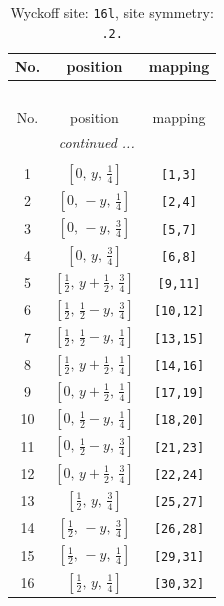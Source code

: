 \documentclass[fleqn,8pt]{jsarticle}
\begin{document}
\renewcommand{\arraystretch}{1.2}
\begin{longtable}{ccc}
\caption{Wyckoff site: {\tt 16l}, site symmetry: {\tt .2.}}
 \\
 \hline \hline
No. & position & mapping \\ \hline \endfirsthead

\multicolumn{2}{l}{\tablename\ \thetable{}} \\
 \hline \hline
No. & position & mapping \\ \hline \endhead

 \hline \hline
\multicolumn{2}{r}{\footnotesize\it continued ...} \\ \endfoot

 \hline \hline
\multicolumn{2}{r}{} \\ \endlastfoot

1 & $\left[ 0,\, y,\, \frac{1}{4} \right]$ & {\tt [1,3]} \\ \hline
2 & $\left[ 0,\, - y,\, \frac{1}{4} \right]$ & {\tt [2,4]} \\ \hline
3 & $\left[ 0,\, - y,\, \frac{3}{4} \right]$ & {\tt [5,7]} \\ \hline
4 & $\left[ 0,\, y,\, \frac{3}{4} \right]$ & {\tt [6,8]} \\ \hline
5 & $\left[ \frac{1}{2},\, y + \frac{1}{2},\, \frac{3}{4} \right]$ & {\tt [9,11]} \\ \hline
6 & $\left[ \frac{1}{2},\, \frac{1}{2} - y,\, \frac{3}{4} \right]$ & {\tt [10,12]} \\ \hline
7 & $\left[ \frac{1}{2},\, \frac{1}{2} - y,\, \frac{1}{4} \right]$ & {\tt [13,15]} \\ \hline
8 & $\left[ \frac{1}{2},\, y + \frac{1}{2},\, \frac{1}{4} \right]$ & {\tt [14,16]} \\ \hline
9 & $\left[ 0,\, y + \frac{1}{2},\, \frac{1}{4} \right]$ & {\tt [17,19]} \\ \hline
10 & $\left[ 0,\, \frac{1}{2} - y,\, \frac{1}{4} \right]$ & {\tt [18,20]} \\ \hline
11 & $\left[ 0,\, \frac{1}{2} - y,\, \frac{3}{4} \right]$ & {\tt [21,23]} \\ \hline
12 & $\left[ 0,\, y + \frac{1}{2},\, \frac{3}{4} \right]$ & {\tt [22,24]} \\ \hline
13 & $\left[ \frac{1}{2},\, y,\, \frac{3}{4} \right]$ & {\tt [25,27]} \\ \hline
14 & $\left[ \frac{1}{2},\, - y,\, \frac{3}{4} \right]$ & {\tt [26,28]} \\ \hline
15 & $\left[ \frac{1}{2},\, - y,\, \frac{1}{4} \right]$ & {\tt [29,31]} \\ \hline
16 & $\left[ \frac{1}{2},\, y,\, \frac{1}{4} \right]$ & {\tt [30,32]} \\
\end{longtable}
\end{document}
